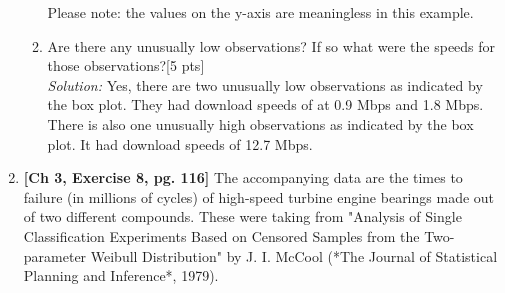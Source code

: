 \documentclass[11pt]{article}\usepackage[]{graphicx}\usepackage[]{color}
\begin{document}
\begin{enumerate}
\begin{enumerate}
Please note: the values on the y-axis are meaningless in this example. 
  \item Are there any unusually low observations? If so what were the speeds for those observations?[5 pts]\\
  \emph{Solution:} Yes, there are two unusually low observations as indicated by the box plot. 
     They had download speeds of at 0.9 Mbps and 1.8 Mbps.
     There is also one unusually high observations as indicated by the box plot. 
     It had download speeds of 12.7 Mbps.







\end{enumerate}

\item  \textbf{[Ch 3, Exercise 8, pg. 116]} The accompanying data are the times to failure (in millions of cycles) of high-speed turbine engine bearings made out of two different compounds. These were taking from "Analysis of Single Classification Experiments Based on Censored Samples from the Two-parameter Weibull Distribution" by J. I. McCool (*The Journal of Statistical Planning and Inference*, 1979).
    


\end{enumerate}
\end{document}
